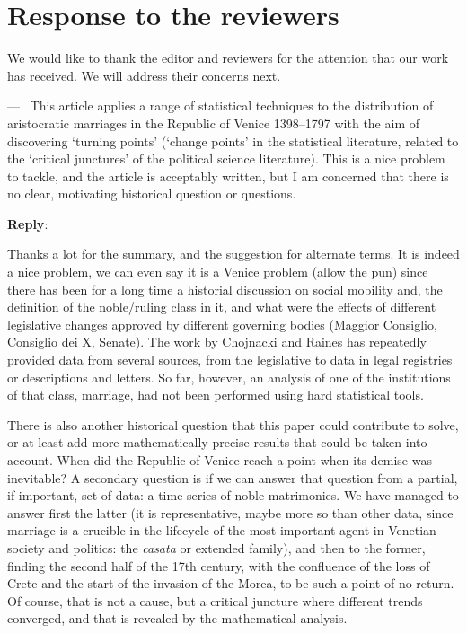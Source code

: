 \documentclass[11pt]{article}
\newcounter{reviewer}
\newcounter{point}[reviewer]
\renewcommand{\thepoint}{P\,\thereviewer.\arabic{point}}
\newenvironment{point}
   {\refstepcounter{point} \bigskip \noindent {\textbf{Reviewer~Point~\thepoint} } ---\ }
   {\par }
\newenvironment{reply}
   {\medskip \noindent \begin{sf}\textbf{Reply}:\  }
   {\medskip \end{sf}}
\begin{document}
\section*{Response to the reviewers}

We would like to thank the editor and reviewers for the attention that our work has received. We will address their concerns next.

\begin{point}
This article applies a range of statistical techniques to the distribution
of aristocratic marriages in the Republic of Venice 1398–1797 with the aim
of discovering ‘turning points’ (‘change points’ in the statistical literature,
related to the ‘critical junctures’ of the political science literature). This
is a nice problem to tackle, and the article is acceptably written, but I am
concerned that there is no clear, motivating historical question or questions.
\end{point}

\begin{reply}

  Thanks a lot for the summary, and the suggestion for alternate terms. It is
  indeed a nice problem, we can even say it is a Venice problem (allow the pun)
  since there has been for a long time a historial discussion on social mobility
  and, the definition of the noble/ruling class in it, and what were the effects
  of different legislative changes approved by different governing bodies
  (Maggior Consiglio, Consiglio dei X, Senate). The work by Chojnacki
  \cite{10.2307/202860,second:serrata,chojnacki00} and Raines
  \cite{raines2013rameau,raines2003cooptazione} has repeatedly provided data
  from several sources, from the legislative to data in legal registries or
  descriptions and letters. So far, however, an analysis of one of the
  institutions of that class, marriage, had not been performed using hard
  statistical tools.

  There is also another historical question that this paper could contribute to
  solve, or at least add more mathematically precise results that could be taken
  into account. When did the Republic of Venice reach a point when its demise
  was inevitable? A secondary question is if we can answer that question from a
  partial, if important, set of data: a time series of noble matrimonies. We
  have managed to answer first the latter (it is representative, maybe more so
  than other data, since marriage is a crucible in the lifecycle of the most
  important agent in Venetian society and politics: the {\em casata} or extended
  family), and then to the former, finding the second half of the 17th century,
  with the confluence of the loss of Crete and the start of the invasion of the
  Morea, to be such a point of no return. Of course, that is not a cause, but a
  critical juncture where different trends converged, and that is revealed by
  the mathematical analysis.
\end{reply}
\end{document}
